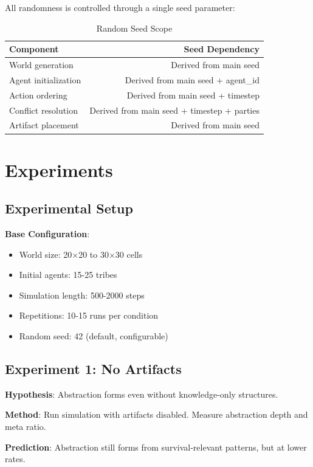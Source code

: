 \documentclass[11pt,a4paper]{article}
\begin{document}
All randomness is controlled through a single seed parameter:

\begin{table}[htbp]
\centering
\caption{Random Seed Scope}
\label{tab:seed}
\begin{tabular}{@{}lr@{}}
\toprule
Component & Seed Dependency \\
\midrule
World generation & Derived from main seed \\
Agent initialization & Derived from main seed + agent\_id \\
Action ordering & Derived from main seed + timestep \\
Conflict resolution & Derived from main seed + timestep + parties \\
Artifact placement & Derived from main seed \\
\bottomrule
\end{tabular}
\end{table}

\section{Experiments}

\subsection{Experimental Setup}

\textbf{Base Configuration}:
\begin{itemize}
    \item World size: 20$\times$20 to 30$\times$30 cells
    \item Initial agents: 15-25 tribes
    \item Simulation length: 500-2000 steps
    \item Repetitions: 10-15 runs per condition
    \item Random seed: 42 (default, configurable)
\end{itemize}

\subsection{Experiment 1: No Artifacts}

\textbf{Hypothesis}: Abstraction forms even without knowledge-only structures.

\textbf{Method}: Run simulation with artifacts disabled. Measure abstraction depth and meta ratio.

\textbf{Prediction}: Abstraction still forms from survival-relevant patterns, but at lower rates.
\end{document}
